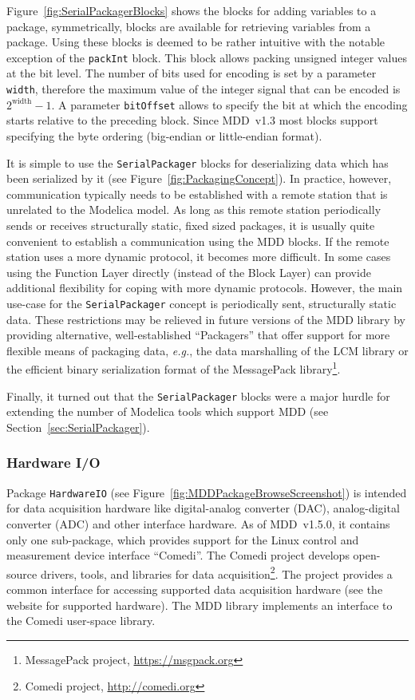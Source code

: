 \documentclass{resources/modelica}
\newcommand{\modelica}[1]{\lstinline[language=modelica]|#1|}
\begin{document}
\noindent
Figure~\ref{fig:SerialPackagerBlocks} shows the blocks for adding
variables to a package, symmetrically, blocks are available for retrieving variables from a
package. Using these blocks is deemed to be rather
intuitive with the notable exception of the \modelica{packInt} block. This
block allows packing unsigned integer values at the bit level. The number of
bits used for encoding is set by a parameter \modelica{width}, therefore the maximum value
of the integer signal that can be encoded is $2^{\mathrm{width}} - 1$. A
parameter \modelica{bitOffset} allows to specify the bit at which the encoding starts
relative to the preceding block. Since MDD~v1.3 most blocks support specifying
the byte ordering (big-endian or little-endian format).

It is simple to use the
\modelica{SerialPackager} blocks for deserializing data which has been serialized by it
(see Figure~\ref{fig:PackagingConcept}). In practice, however, communication
typically needs to be established with a remote station that is unrelated to
the Modelica model. As long as this remote station periodically sends or
receives structurally static, fixed sized packages, it is usually quite
convenient to establish a communication using the MDD blocks. If the remote
station uses a more dynamic protocol, it becomes more difficult. In some cases
using the \textsf{Function Layer} directly (instead of the \textsf{Block Layer})
can provide additional flexibility for coping with more dynamic protocols.
However, the main use-case for the \modelica{SerialPackager} concept is periodically
sent, structurally static data. These restrictions may be relieved in
future versions of the MDD library by providing alternative, well-established ``Packagers'' that offer support for more
flexible means of packaging data, \textit{e.g.}, the data marshalling of the LCM library or
the efficient binary serialization format of the MessagePack library\footnote{MessagePack project,
\url{https://msgpack.org}}.

Finally, it turned out that the \modelica{SerialPackager} blocks were a major hurdle for
extending the number of Modelica tools which support MDD (see Section~\ref{sec:SerialPackager}).

\subsubsection{Hardware I/O}

Package \modelica{HardwareIO} (see
Figure~\ref{fig:MDDPackageBrowseScreenshot}) is intended for data acquisition
hardware like digital-analog converter (DAC), analog-digital converter (ADC) and
other interface hard\-ware.
As of MDD~v1.5.0, it contains only one sub-package, which
provides support for the Linux control and mea\-sure\-ment device interface
``Comedi''. The Comedi project develops open-source drivers, tools, and
libraries for data acquisition\footnote{Comedi project,
\url{http://comedi.org}}. The project provides a common interface for
accessing supported data acquisition hardware (see the website for supported
hardware). The MDD library implements an interface to the Comedi user-space
library.
\end{document}
